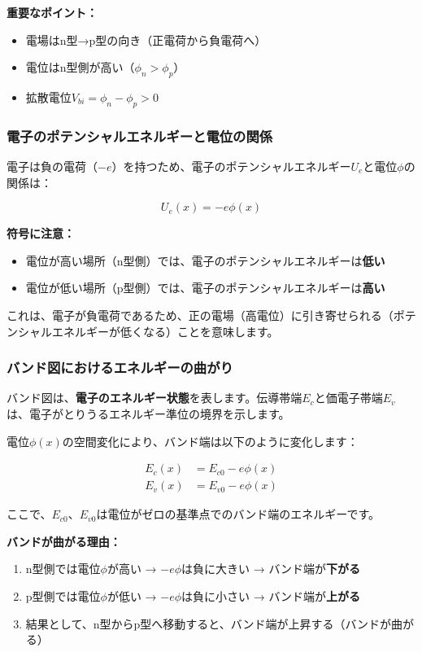 \textbf{重要なポイント：}
\begin{itemize}
\item 電場はn型→p型の向き（正電荷から負電荷へ）
\item 電位はn型側が高い（$\phi_n > \phi_p$）
\item 拡散電位$V_{bi} = \phi_n - \phi_p > 0$
\end{itemize}

\subsubsection{電子のポテンシャルエネルギーと電位の関係}

電子は負の電荷（$-e$）を持つため、電子のポテンシャルエネルギー$U_e$と電位$\phi$の関係は：

\begin{equation}
U_e(x) = -e\phi(x)
\end{equation}

\textbf{符号に注意：}

\begin{itemize}
\item 電位が高い場所（n型側）では、電子のポテンシャルエネルギーは\textbf{低い}
\item 電位が低い場所（p型側）では、電子のポテンシャルエネルギーは\textbf{高い}
\end{itemize}

これは、電子が負電荷であるため、正の電場（高電位）に引き寄せられる（ポテンシャルエネルギーが低くなる）ことを意味します。

\subsubsection{バンド図におけるエネルギーの曲がり}

バンド図は、\textbf{電子のエネルギー状態}を表します。伝導帯端$E_c$と価電子帯端$E_v$は、電子がとりうるエネルギー準位の境界を示します。

電位$\phi(x)$の空間変化により、バンド端は以下のように変化します：

\begin{align}
E_c(x) &= E_{c0} - e\phi(x) \\
E_v(x) &= E_{v0} - e\phi(x)
\end{align}

ここで、$E_{c0}$、$E_{v0}$は電位がゼロの基準点でのバンド端のエネルギーです。

\textbf{バンドが曲がる理由：}

\begin{enumerate}
\item n型側では電位$\phi$が高い → $-e\phi$は負に大きい → バンド端が\textbf{下がる}
\item p型側では電位$\phi$が低い → $-e\phi$は負に小さい → バンド端が\textbf{上がる}
\item 結果として、n型からp型へ移動すると、バンド端が上昇する（バンドが曲がる）
\end{enumerate}

